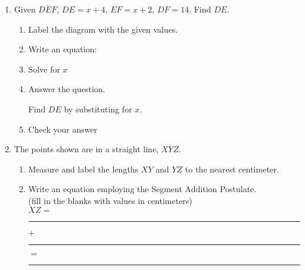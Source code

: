 \begin{enumerate}
\item Given $\overline{DEF}$, $DE=x+4$, $EF=x+2$, $DF=14$. Find ${DE}$.
  \begin{enumerate}
  \item Label the diagram with the given values.
  \begin{flushright}
  \end{flushright} \vspace{0.5cm}
  \item Write an equation: \vspace{1cm}
  \item Solve for $x$
  \vspace{3cm}
  \item Answer the question. \par \smallskip
  Find $DE$ by substituting for $x$. \vspace{1.5cm}
  \item Check your answer
  \end{enumerate}

\newpage
\item The points shown are in a straight line, $\overline{XYZ}$. 
\begin{enumerate}
  \item Measure and label the lengths $XY$ and $YZ$ to the nearest centimeter.\\[1.5cm]
     \vspace{0.5cm}
  \item Write an equation employing the Segment Addition Postulate.\\ (fill in the blanks with values in centimeters)\\[1cm]
  $XZ=$ \rule{2cm}{0.15mm} $+$ \rule{2cm}{0.15mm} $=$ \rule{2cm}{0.15mm}
\end{enumerate} \vspace{0.5cm}


\end{enumerate}

